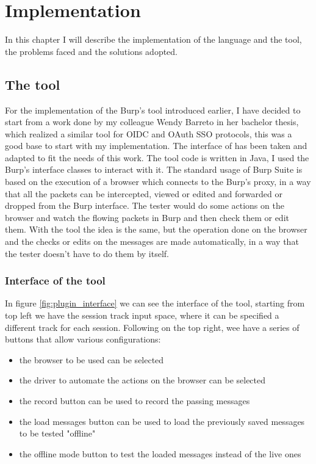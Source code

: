 \chapter{Implementation}
In this chapter I will describe the implementation of the language and the tool, the problems faced and the solutions adopted.

\section{The tool}
For the implementation of the Burp's tool introduced earlier, I have decided to start from a work done by my colleague Wendy Barreto \cite{wendy_barreto} in her bachelor thesis, which realized a similar tool for OIDC and OAuth SSO protocols, this was a good base to start with my implementation. The interface of \cite{wendy_barreto} has been taken and adapted to fit the needs of this work. The tool code is written in Java, I used the Burp's interface classes to interact with it.
The standard usage of Burp Suite is based on the execution of a browser which connects to the Burp's proxy, in a way that all the packets can be intercepted, viewed or edited and forwarded or dropped from the Burp interface. The tester would do some actions on the browser and watch the flowing packets in Burp and then check them or edit them. With the tool the idea is the same, but the operation done on the browser and the checks or edits on the messages are made automatically, in a way that the tester doesn't have to do them by itself.

\subsection{Interface of the tool}
In figure \ref{fig:plugin_interface} we can see the interface of the tool, starting from top left we have the session track input space, where it can be specified a different track for each session. Following on the top right, wee have a series of buttons that allow various configurations:
\begin{itemize}
    \item the browser to be used can be selected
    \item the driver to automate the actions on the browser can be selected
    \item the record button can be used to record the passing messages
    \item the load messages button can be used to load the previously saved messages to be tested "offline"
    \item the offline mode button to test the loaded messages instead of the live ones
\end{itemize}


